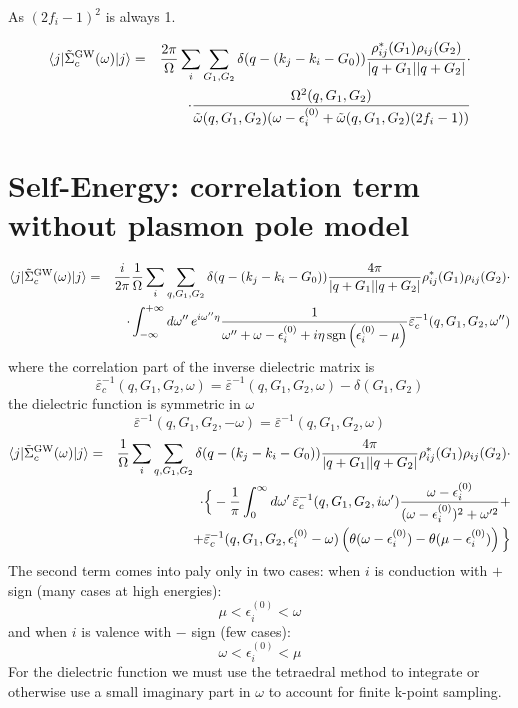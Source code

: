 \documentclass[fleqn]{article}
\begin{document}
As $(2 f_i - 1)^2$ is always 1.

\begin{eqnarray*}
\langle j | \tilde{\Sigma}^{\rm GW}_{c}(\omega) | j \rangle
&=&  \frac{2 \pi}{\Omega} \sum_i \sum_{G_1,G_2} \delta(q-(k_j - k_i - G_0))
   \frac{\rho^*_{ij}(G_1) \rho_{ij}(G_2)}{|q+G_1||q+G_2|}
   \cdot \\ && \cdot
   \frac{\Omega^2(q,G_1,G_2)}
  {\tilde{\omega}(q,G_1,G_2) ( \omega - \epsilon^{(0)}_i + \tilde{\omega}(q,G_1,G_2) (2 f_i - 1))}
\end{eqnarray*}


\newpage

\section{Self-Energy: correlation term without plasmon pole model}

\begin{eqnarray*}
\langle j | \tilde{\Sigma}^{\rm GW}_{c}(\omega) | j \rangle
&=&  \frac{i}{2 \pi} \frac{1}{\Omega} \sum_i \sum_{q,G_1,G_2} \delta(q-(k_j - k_i - G_0))
   \frac{4\pi}{|q+G_1||q+G_2|}
  \rho^*_{ij}(G_1) \rho_{ij}(G_2)  \cdot \\ && \cdot
  \int_{-\infty}^{+\infty} d\omega'' \, e^{i \omega'' \eta}
   \frac{1}{\omega'' + \omega - \epsilon^{(0)}_i + i \eta \mathrm{\, sgn} \left( \epsilon^{(0)}_i - \mu \right)}
  \bar\varepsilon^{-1}_c(q,G_1,G_2,\omega'')
\end{eqnarray*}
where the correlation part of the inverse dielectric matrix is
\[
  \bar\varepsilon^{-1}_c(q,G_1,G_2,\omega) =
  \bar\varepsilon^{-1}(q,G_1,G_2,\omega) - \delta(G_1,G_2)
\]
the dielectric function is symmetric in $\omega$
\[
  \bar\varepsilon^{-1}(q,G_1,G_2,-\omega) =  \bar\varepsilon^{-1}(q,G_1,G_2,\omega)
\]
\begin{eqnarray*}
\langle j | \tilde{\Sigma}^{\rm GW}_{c}(\omega) | j \rangle
&=&  \frac{1}{\Omega} \sum_i \sum_{q,G_1,G_2} \delta(q-(k_j - k_i - G_0))
   \frac{4\pi}{|q+G_1||q+G_2|}
  \rho^*_{ij}(G_1) \rho_{ij}(G_2)  \cdot \\ && \cdot \Big\{
  - \frac{1}{\pi} \int_0^\infty d \omega' \, \bar\varepsilon^{-1}_c(q,G_1,G_2,i\omega')
  \frac{\omega - \epsilon^{(0)}_i}{(\omega - \epsilon^{(0)}_i)^2 + \omega'^2} + \\ &&
 + \bar\varepsilon^{-1}_c(q,G_1,G_2,\epsilon^{(0)}_i - \omega)
  \left( \theta(\omega - \epsilon^{(0)}_i) - \theta(\mu - \epsilon^{(0)}_i) \right) \Big\}
\end{eqnarray*}
The second term comes into paly only in two cases:
when $i$ is conduction with $+$ sign (many cases at high energies):
\[
  \mu < \epsilon^{(0)}_i < \omega
\]
and when $i$ is valence with $-$ sign (few cases):
\[
  \omega < \epsilon^{(0)}_i < \mu
\]
For the dielectric function we must use the tetraedral method to integrate
or otherwise use a small imaginary part in $\omega$ to account for finite
k-point sampling.
\end{document}
